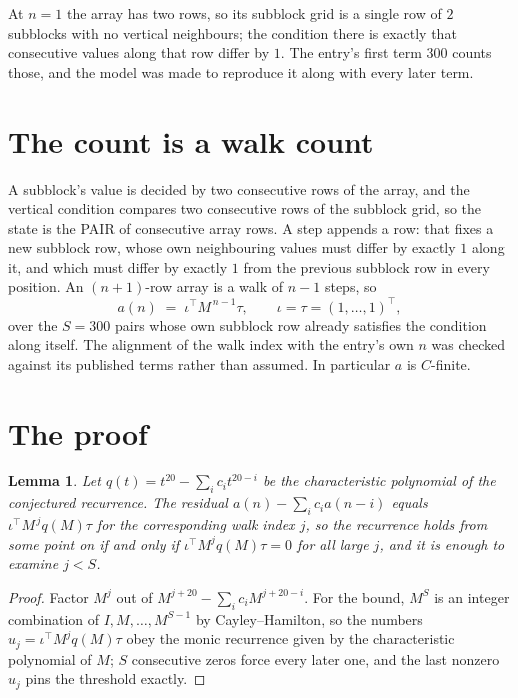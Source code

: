 \documentclass[11pt,a4paper]{article}
\theoremstyle{plain}
\newtheorem{lemma}[theorem]{Lemma}
\theoremstyle{definition}
\begin{document}
At $n=1$ the array has two rows, so its subblock grid is a single row of $2$ subblocks with
no vertical neighbours; the condition there is exactly that consecutive values along that row
differ by $1$. The entry's first term $300$ counts those, and the model was made to
reproduce it along with every later term.

\section{The count is a walk count}

A subblock's value is decided by two consecutive rows of the array, and the
vertical condition compares two consecutive rows of the subblock grid, so the state is the
PAIR of consecutive array rows. A step appends a row: that fixes a new subblock row, whose own
neighbouring values must differ by exactly $1$ along it, and which must differ by exactly
$1$ from the previous subblock row in every position. An $(n+1)$-row array is a walk of
$n-1$ steps, so
\[
a(n)\;=\;\iota^{\!\top}M^{\,n-1}\tau,\qquad\iota=\tau=(1,\dots,1)^{\!\top},
\]
over the $S=300$ pairs whose own subblock row already satisfies the condition along itself.
The alignment of the walk index with the entry's own $n$ was checked against its published
terms rather than assumed. In particular $a$ is $C$-finite.

\section{The proof}

\begin{lemma}\label{lem:crit}
Let $q(t)=t^{20}-\sum_i c_it^{20-i}$ be the characteristic polynomial of the
conjectured recurrence. The residual $a(n)-\sum_ic_ia(n-i)$ equals
$\iota^{\!\top}M^{\,j}q(M)\tau$ for the corresponding walk index $j$, so the recurrence
holds from some point on if and only if $\iota^{\!\top}M^{j}q(M)\tau=0$ for all large $j$,
and it is enough to examine $j<S$.
\end{lemma}

\begin{proof}
Factor $M^{j}$ out of $M^{j+20}-\sum_ic_iM^{j+20-i}$. For the bound, $M^{S}$
is an integer combination of $I,M,\dots,M^{S-1}$ by Cayley--Hamilton, so the numbers
$u_j=\iota^{\!\top}M^{j}q(M)\tau$ obey the monic recurrence given by the characteristic
polynomial of $M$; $S$ consecutive zeros force every later one, and the last nonzero $u_j$
pins the threshold exactly.
\end{proof}
\end{document}
